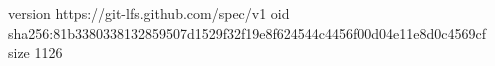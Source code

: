 version https://git-lfs.github.com/spec/v1
oid sha256:81b3380338132859507d1529f32f19e8f624544c4456f00d04e11e8d0c4569cf
size 1126
